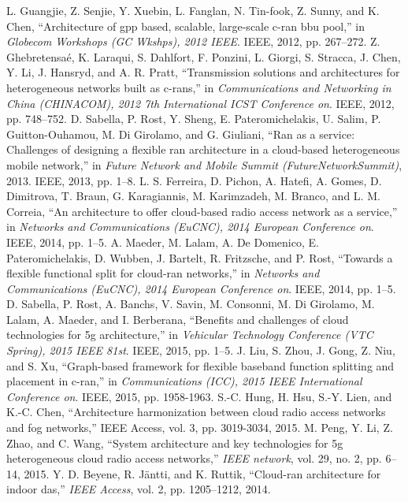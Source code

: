 \begin{multicols}{2}
\begin{thebibliography}{99}
 L. Guangjie, Z. Senjie, Y. Xuebin, L. Fanglan, N. Tin-fook, Z. Sunny, and K. Chen, “Architecture of gpp based, scalable, large-scale c-ran bbu
pool,” in \textit{Globecom Workshops (GC Wkshps), 2012 IEEE}. IEEE, 2012, pp. 267–272.
 Z. Ghebretensaé, K. Laraqui, S. Dahlfort, F. Ponzini, L. Giorgi, S. Stracca, J. Chen, Y. Li, J. Hansryd, and A. R. Pratt, “Transmission solutions and architectures for heterogeneous networks built as c-rans,” in \textit{Communications and Networking in China (CHINACOM), 2012 7th International ICST Conference on}. IEEE, 2012, pp. 748–752.
 D. Sabella, P. Rost, Y. Sheng, E. Pateromichelakis, U. Salim, P. Guitton-Ouhamou, M. Di Girolamo, and G. Giuliani, “Ran as a service: Challenges of designing a flexible ran architecture in a cloud-based heterogeneous mobile network,” in \textit{Future Network and Mobile Summit (FutureNetworkSummit)}, 2013. IEEE, 2013, pp. 1–8.
 L. S. Ferreira, D. Pichon, A. Hatefi, A. Gomes, D. Dimitrova, T. Braun, G. Karagiannis, M. Karimzadeh, M. Branco, and L. M. Correia, “An architecture to offer cloud-based radio access network as a service,” in \textit{Networks and Communications (EuCNC), 2014 European Conference on}. IEEE, 2014, pp. 1–5.
 A. Maeder, M. Lalam, A. De Domenico, E. Pateromichelakis, D. Wubben, J. Bartelt, R. Fritzsche, and P. Rost, “Towards a flexible functional split for cloud-ran networks,” in \textit{Networks and Communications (EuCNC), 2014 European Conference on}. IEEE, 2014, pp. 1–5.
 D. Sabella, P. Rost, A. Banchs, V. Savin, M. Consonni, M. Di Girolamo, M. Lalam, A. Maeder, and I. Berberana, “Benefits and challenges of cloud technologies for 5g architecture,” in \textit{Vehicular Technology Conference (VTC Spring), 2015 IEEE 81st}. IEEE, 2015, pp. 1–5.
 J. Liu, S. Zhou, J. Gong, Z. Niu, and S. Xu, “Graph-based framework for flexible baseband function splitting and placement in c-ran,” in \textit{Communications (ICC), 2015 IEEE International Conference on}. IEEE, 2015, pp. 1958-1963.
 S.-C. Hung, H. Hsu, S.-Y. Lien, and K.-C. Chen, “Architecture harmonization between cloud radio access networks and fog networks,” IEEE Access, vol. 3, pp. 3019-3034, 2015.
 M. Peng, Y. Li, Z. Zhao, and C. Wang, “System architecture and key technologies for 5g heterogeneous cloud radio access networks,” \textit{IEEE network}, vol. 29, no. 2, pp. 6–14, 2015.
 Y. D. Beyene, R. Jäntti, and K. Ruttik, “Cloud-ran architecture for indoor das,” \textit{IEEE Access}, vol. 2, pp. 1205–1212, 2014.

\end{thebibliography}
\end{multicols}
